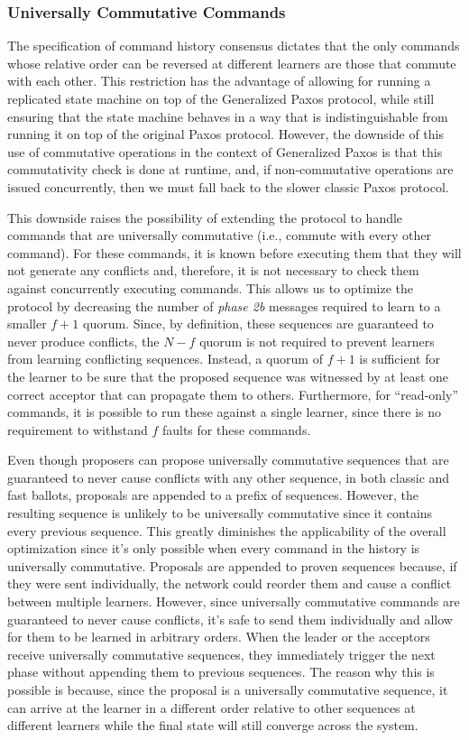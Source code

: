 \subsubsection{Universally Commutative Commands}
The specification of command history consensus dictates that the only commands whose relative order can be reversed at different learners are those that commute with each other. This restriction has the advantage of allowing for running a replicated state machine on top of the Generalized Paxos protocol, while still ensuring that the state machine behaves in a way that is indistinguishable from running it on top of the original Paxos protocol. However, the downside of this use of commutative operations in the context of Generalized Paxos is that this commutativity check is done at runtime, and, if non-commutative operations are issued concurrently, then we must fall back to the slower classic Paxos protocol.\par
This downside raises the possibility of extending the protocol to handle commands that are universally commutative (i.e., commute with every other command). For these commands, it is known before executing them that they will not generate any conflicts and, therefore, it is not necessary to check them against concurrently executing commands. This allows us to optimize the protocol by decreasing the number of \textit{phase 2b} messages required to learn to a smaller $f+1$ quorum. Since, by definition, these sequences are guaranteed to never produce conflicts, the $N-f$ quorum is not required to prevent learners from learning conflicting sequences. Instead, a quorum of $f+1$ is sufficient for the learner to be sure that the proposed sequence was witnessed by at least one correct acceptor that can propagate them to others. Furthermore, for ``read-only'' commands, it is possible to run these against a single learner, since there is no requirement to withstand $f$ faults for these commands. \par
Even though proposers can propose universally commutative sequences that are guaranteed to never cause conflicts with any other sequence, in both classic and fast ballots, proposals are appended to a prefix of sequences. However, the resulting sequence is unlikely to be universally commutative since it contains every previous sequence. This greatly diminishes the applicability of the overall optimization since it's only possible when every command in the history is universally commutative. Proposals are appended to proven sequences because, if they were sent individually, the network could reorder them and cause a conflict between multiple learners. However, since universally commutative commands are guaranteed to never cause conflicts, it's safe to send them individually and allow for them to be learned in arbitrary orders. When the leader or the acceptors receive universally commutative sequences, they immediately trigger the next phase without appending them to previous sequences. The reason why this is possible is because, since the proposal is a universally commutative sequence, it can arrive at the learner in a different order relative to other sequences at different learners while the final state will still converge across the system.\par
